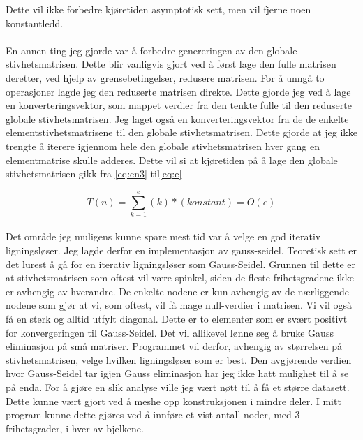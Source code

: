 \documentclass[10pt,a4paper, norsk]{article}
\begin{document}
Dette vil ikke forbedre kjøretiden asymptotisk sett, men vil fjerne noen konstantledd.

\paragraph*{}
En annen ting jeg gjorde var å forbedre genereringen av den globale stivhetsmatrisen. Dette blir vanligvis gjort ved å først lage den fulle matrisen deretter, ved hjelp av grensebetingelser, redusere matrisen. For å unngå to operasjoner lagde jeg den reduserte matrisen direkte. Dette gjorde jeg ved å lage en konverteringsvektor, som mappet verdier fra den tenkte fulle til den reduserte globale stivhetsmatrisen. Jeg laget også en konverteringsvektor fra de de enkelte elementstivhetsmatrisene til den globale stivhetsmatrisen. Dette gjorde at jeg ikke trengte å iterere igjennom hele den globale stivhetsmatrisen hver gang en elementmatrise skulle adderes. Dette vil si at kjøretiden på å lage den globale stivhetsmatrisen gikk fra \eqref{eq:en3} til\eqref{eq:e}

\begin{equation} \label{eq:e}
T(n) = \sum_{k=1}^{e} (k)*(konstant)= O(e)
\end{equation}  

\paragraph*{}
Det område jeg muligens kunne spare mest tid var å velge en god iterativ ligningsløser. Jeg lagde derfor en implementasjon av gauss-seidel. Teoretisk sett er det lurest å gå for en iterativ ligningsløser som Gauss-Seidel. Grunnen til dette er at stivhetsmatrisen som oftest vil være spinkel, siden de fleste frihetsgradene ikke er avhengig av hverandre. De enkelte nodene er kun avhengig av de nærliggende nodene som gjør at vi, som oftest, vil få mage null-verdier i matrisen. Vi vil også få en sterk og alltid utfylt diagonal. Dette er to elementer som er svært positivt for konvergeringen til Gauss-Seidel. Det vil allikevel lønne seg å bruke Gauss eliminasjon på små matriser. Programmet vil derfor, avhengig av størrelsen på stivhetsmatrisen, velge hvilken ligningsløser som er best. 
Den avgjørende verdien hvor Gauss-Seidel tar igjen Gauss eliminasjon har jeg ikke hatt mulighet til å se på enda. For å gjøre en slik analyse ville jeg vært nøtt til å få et større datasett. Dette kunne vært gjort ved å meshe opp konstruksjonen i mindre deler. I mitt program kunne dette gjøres ved å innføre et vist antall noder, med 3 frihetsgrader, i hver av bjelkene. 
\end{document}
